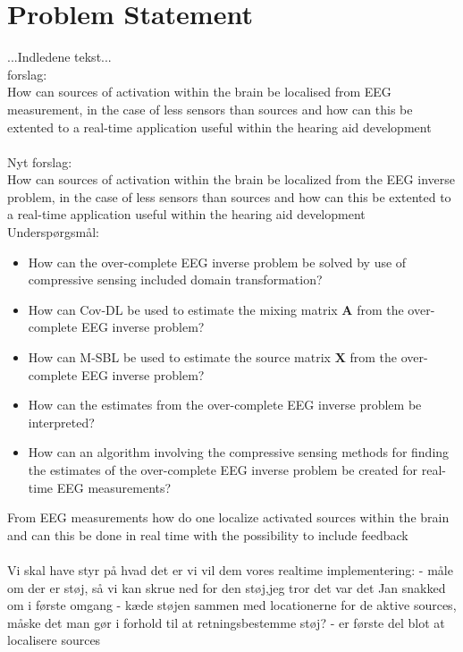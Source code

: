\chapter{Problem Statement}
...Indledene tekst...\\ 

forslag:\\
How can sources of activation within the brain be localised from EEG measurement, in the case of less sensors than sources and how can this be extented to a real-time application useful within the hearing aid development\\
\\
Nyt forslag: \\
How can sources of activation within the brain be localized from the EEG inverse problem, in the case of less sensors than sources and how can this be extented to a real-time application useful within the hearing aid development
\\

Underspørgsmål:\\
\begin{itemize}
\item How can the over-complete EEG inverse problem be solved by use of compressive sensing included domain transformation?
\item How can Cov-DL be used to estimate the mixing matrix $\mathbf{A}$ from the over-complete EEG inverse problem?
\item How can M-SBL be used to estimate the source matrix $\mathbf{X}$ from the over-complete EEG inverse problem?
\item How can the estimates from the over-complete EEG inverse problem be interpreted?
\item How can an algorithm involving the compressive sensing methods for finding the estimates of the over-complete EEG inverse problem be created for real-time EEG measurements?
\end{itemize}





From EEG measurements how do one localize activated sources within the brain and can this be done in real time with the possibility to include feedback 
\\ \\



Vi skal have styr på hvad det er vi vil dem vores realtime implementering: 
- måle om der er støj, så vi kan skrue ned for den støj,jeg tror det var det Jan snakked om i første omgang 
- kæde støjen sammen med locationerne for de aktive sources, måske det man gør i forhold til at retningsbestemme støj? 
- er første del blot at localisere sources  

 